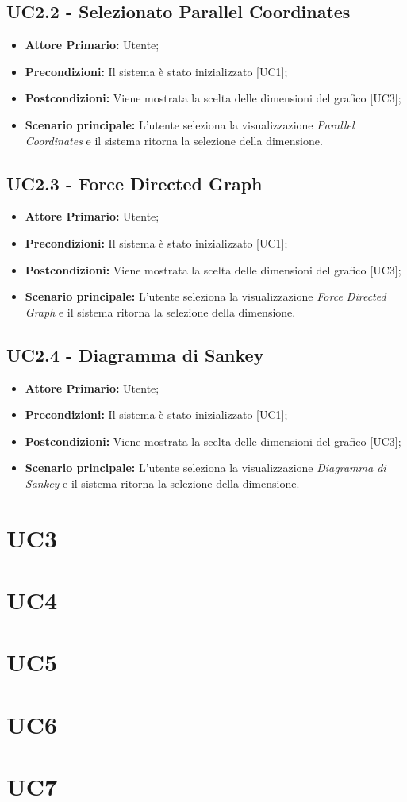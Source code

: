 \subsection{UC2.2 - Selezionato Parallel Coordinates}
\begin{itemize}
   \item \textbf{Attore Primario:} Utente;
   \item \textbf{Precondizioni:} Il sistema è stato inizializzato [UC1];
   \item \textbf{Postcondizioni:} Viene mostrata la scelta delle dimensioni del grafico [UC3];
   \item \textbf{Scenario principale:} L'utente seleziona la visualizzazione \textit{Parallel Coordinates} e il sistema ritorna la selezione della dimensione.
\end{itemize}
\subsection{UC2.3 - Force Directed Graph}
\begin{itemize}
   \item \textbf{Attore Primario:} Utente;
   \item \textbf{Precondizioni:} Il sistema è stato inizializzato [UC1];
   \item \textbf{Postcondizioni:} Viene mostrata la scelta delle dimensioni del grafico [UC3];
   \item \textbf{Scenario principale:} L'utente seleziona la visualizzazione \textit{Force Directed Graph} e il sistema ritorna la selezione della dimensione.
\end{itemize}
\subsection{UC2.4 - Diagramma di Sankey}
\begin{itemize}
   \item \textbf{Attore Primario:} Utente;
   \item \textbf{Precondizioni:} Il sistema è stato inizializzato [UC1];
   \item \textbf{Postcondizioni:} Viene mostrata la scelta delle dimensioni del grafico [UC3];
   \item \textbf{Scenario principale:} L'utente seleziona la visualizzazione \textit{Diagramma di Sankey} e il sistema ritorna la selezione della dimensione.
\end{itemize}

\section{UC3}

\section{UC4}

\section{UC5}

\section{UC6}

\section{UC7}
